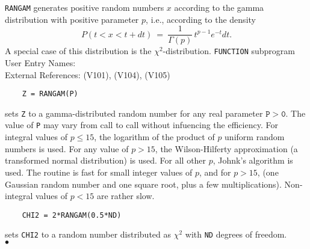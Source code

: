                                
                 
\Submitter{}                                     
{\tt RANGAM} generates positive random numbers $x$ according to the
gamma distribution with positive parameter $p$, i.e., according to the
density
$$ P(t < x < t+dt) \ = \
\displaystyle \frac{1}{\Gamma (p)}\, t^{p-1}e^{-t}dt. $$
A special case of this distribution is the $\chi ^2$-distribution.
\Structure
{\tt FUNCTION} subprogram   \\
User Entry Names: \\
External References:  (V101),  (V104),
 (V105)
\Usage
\begin{verbatim}
    Z = RANGAM(P)
\end{verbatim}
sets {\tt Z} to a gamma-distributed random number for any real parameter
$\mathtt{P > 0}$. The value of {\tt P} may vary from call to call without
infuencing the efficiency.
\Method
For integral values of $p \leq 15$, the logarithm of the product of
$p$ uniform random numbers is used. For any value of $p > 15$,
the Wilson-Hilferty approximation (a transformed normal distribution)
is used. For all other $p$, Johnk's algorithm is used.
\Notes
The routine is fast for small integer values of $p$,  and for $p > 15$,
(one Gaussian random number and one square root, plus a few
multiplications). Non-integral values of $p < 15$ are rather slow.
\Examples
\begin{verbatim}
    CHI2 = 2*RANGAM(0.5*ND)
\end{verbatim}
sets {\tt CHI2} to a random number distributed as $\chi ^2$ with
{\tt ND} degrees of freedom.
\\ $\bullet$
